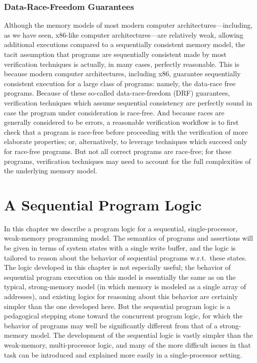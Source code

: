 \documentclass[11pt]{report}         %
\begin{document}
\subsection{Data-Race-Freedom Guarantees} 
\label{sec:drf}

Although the memory models of most modern computer architectures---including, as we have seen, x86-like computer architectures---are relatively weak, allowing additional executions compared to a sequentially consistent memory model, the tacit assumption that programs are sequentially consistent made by most verification techniques is actually, in many cases, perfectly reasonable. This is because modern computer architectures, including x86, guarantee sequentially consistent execution for a large class of programs: namely, the data-race free programs. Because of these so-called data-race-freedom (DRF) guarantees, verification techniques which assume sequential consistency are perfectly sound in case the program under consideration is race-free. And because races are generally considered to be errors, a reasonable verification workflow is to first check that a program is race-free before proceeding with the verification of more elaborate properties; or, alternatively, to leverage techniques which succeed only for race-free programs. But not all correct programs are race-free; for these programs, verification techniques may need to account for the full complexities of the underlying memory model. 

\chapter{A Sequential Program Logic}
\label{ch:uniprocessor}

In this chapter we describe a program logic for a sequential, single-processor, weak-memory programming model. The semantics of programs and assertions will be given in terms of system states with a single write buffer, and the logic is tailored to reason about the behavior of sequential programs w.r.t.\ these states. The logic developed in this chapter is not especially useful; the behavior of sequential program execution on this model is essentially the same as on the typical, strong-memory model (in which memory is modeled as a single array of addresses), and existing logics for reasoning about this behavior are certainly simpler than the one developed here. But the sequential program logic is a pedagogical stepping stone toward the concurrent program logic, for which the behavior of programs may well be significantly different from that of a strong-memory model. The development of the sequential logic is vastly simpler than the weak-memory, multi-processor logic, and many of the more difficult issues in that task can be introduced and explained more easily in a single-processor setting. 
\end{document}

